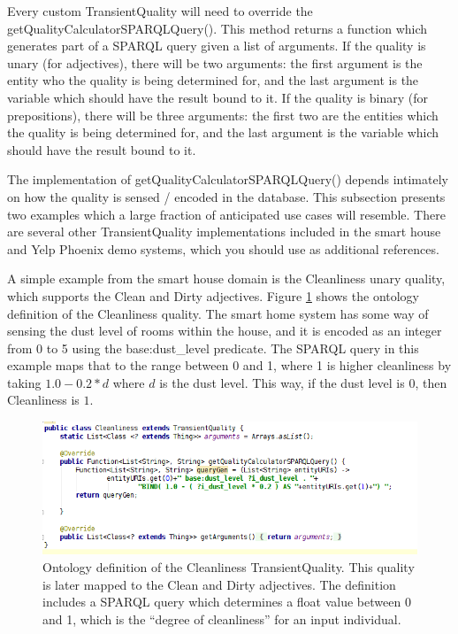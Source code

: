 \documentclass[titlepage]{article}
\begin{document}
Every custom TransientQuality will need to override the getQualityCalculatorSPARQLQuery().
This method returns a function which generates part of a SPARQL query given a list of arguments.
If the quality is unary (for adjectives), there will be two arguments: the first argument is the entity who the quality is being determined for, and the last argument is the variable which should have the result bound to it.
If the quality is binary (for prepositions), there will be three arguments: the first two are the entities which the quality is being determined for, and the last argument is the variable which should have the result bound to it.

The implementation of getQualityCalculatorSPARQLQuery() depends intimately on how the quality is sensed / encoded in the database.
This subsection presents two examples which a large fraction of anticipated use cases will resemble.
There are several other TransientQuality implementations included in the smart house and Yelp Phoenix demo systems, which you should use as additional references.


A simple example from the smart house domain is the Cleanliness unary quality, which supports the Clean and Dirty adjectives.
Figure \ref{fig:cleanliness_quality} shows the ontology definition of the Cleanliness quality.
The smart home system has some way of sensing the dust level of rooms within the house, and it is encoded as an integer from 0 to 5 using the base:dust\_level predicate.
The SPARQL query in this example maps that to the range between 0 and 1, where 1 is higher cleanliness by taking $1.0 - 0.2 * d$ where $d$ is the dust level.
This way, if the dust level is $0$, then Cleanliness is $1$.

\begin{figure}[h!]
\centering
\includegraphics[width=\textwidth]{CleanlinessQuality}
\caption{Ontology definition of the Cleanliness TransientQuality.
This quality is later mapped to the Clean and Dirty adjectives.
The definition includes a SPARQL query which determines a float value between 0 and 1, which is the ``degree of cleanliness'' for an input individual.}
\label{fig:cleanliness_quality}
\end{figure}
\end{document}
